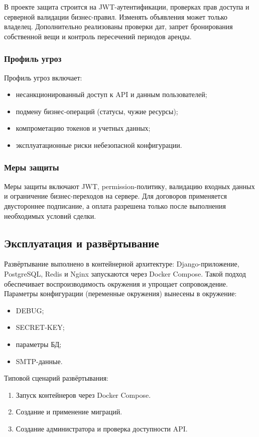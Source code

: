 В проекте защита строится на JWT-аутентификации, проверках прав доступа и серверной валидации бизнес-правил. Изменять объявления может только владелец. Дополнительно реализованы проверки дат, запрет бронирования собственной вещи и контроль пересечений периодов аренды.
\subsubsection{Профиль угроз}
Профиль угроз включает:
\begin{itemize}
    \item несанкционированный доступ к API и данным пользователей;
    \item подмену бизнес-операций (статусы, чужие ресурсы);
    \item компрометацию токенов и учетных данных;
    \item эксплуатационные риски небезопасной конфигурации.
\end{itemize}
\subsubsection{Меры защиты}
Меры защиты включают JWT, permission-политику, валидацию входных данных и ограничение бизнес-переходов на сервере. Для договоров применяется двустороннее подписание, а оплата разрешена только после выполнения необходимых условий сделки.
\subsection{Эксплуатация и развёртывание}
Развёртывание выполнено в контейнерной архитектуре: Django-приложение, PostgreSQL, Redis и Nginx запускаются через Docker Compose. Такой подход обеспечивает воспроизводимость окружения и упрощает сопровождение.
Параметры конфигурации (переменные окружения) вынесены в окружение:
\begin{itemize}
    \item DEBUG;
    \item SECRET-KEY;
    \item параметры БД;
    \item SMTP-данные.
\end{itemize}
Типовой сценарий развёртывания:
\begin{enumerate}
    \item Запуск контейнеров через Docker Compose.
    \item Создание и применение миграций. 
    \item Создание администратора и проверка доступности API. 
\end{enumerate}




